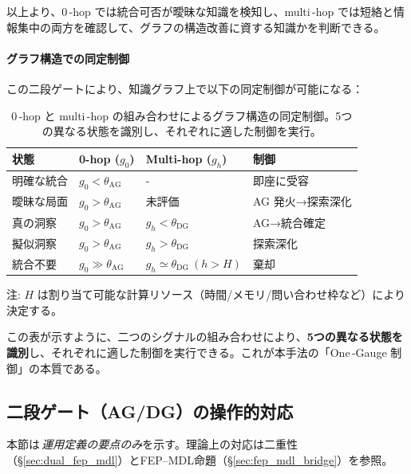 \documentclass[ja=standard,xelatex]{bxjsarticle}
\begin{document}
\noindent 以上より、0\,\mbox{-}hop では統合可否が曖昧な知識を検知し、multi\,\mbox{-}hop では短絡と情報集中の両方を確認して、グラフの構造改善に資する知識かを判断できる。


\paragraph{グラフ構造での同定制御}
この二段ゲートにより、知識グラフ上で以下の同定制御が可能になる：

\begin{table}[H]
\centering
\small
\begin{tabular}{llll}
\toprule
状態 & 0-hop ($g_0$) & Multi-hop ($g_{h}$) & 制御 \\
\midrule
明確な統合 & $g_0<\theta_{\mathrm{AG}}$ & - & 即座に受容 \\
曖昧な局面 & $g_0>\theta_{\mathrm{AG}}$ & 未評価 & AG 発火→探索深化 \\
真の洞察 & $g_0>\theta_{\mathrm{AG}}$ & $g_h<\theta_{\mathrm{DG}}$ & AG→統合確定 \\
擬似洞察 & $g_0>\theta_{\mathrm{AG}}$ & $g_h>\theta_{\mathrm{DG}}$ & 探索深化 \\
統合不要 & $g_0\gg\theta_{\mathrm{AG}}$ & $g_h\simeq\theta_{\mathrm{DG}}\ (h>H)$ & 棄却 \\
\bottomrule
\end{tabular}

\vspace{0.4ex}\noindent\footnotesize{注: $H$ は割り当て可能な計算リソース（時間/メモリ/問い合わせ枠など）により決定する。}\normalsize
\caption{0\,\mbox{-}hop と multi\,\mbox{-}hop の組み合わせによるグラフ構造の同定制御。5つの異なる状態を識別し、それぞれに適した制御を実行。}
\label{tab:graph_control}
\end{table}

この表が示すように、二つのシグナルの組み合わせにより、\textbf{5つの異なる状態を識別}し、それぞれに適した制御を実行できる。これが本手法の「One\,\mbox{-}Gauge 制御」の本質である。


\subsection{二段ゲート（AG/DG）の操作的対応}
\label{sec:ag_dg_gate}

本節は\,\emph{運用定義の要点のみ}を示す。理論上の対応は二重性（\S\ref{sec:dual_fep_mdl}）とFEP–MDL命題（\S\ref{sec:fep_mdl_bridge}）を参照。
\end{document}
